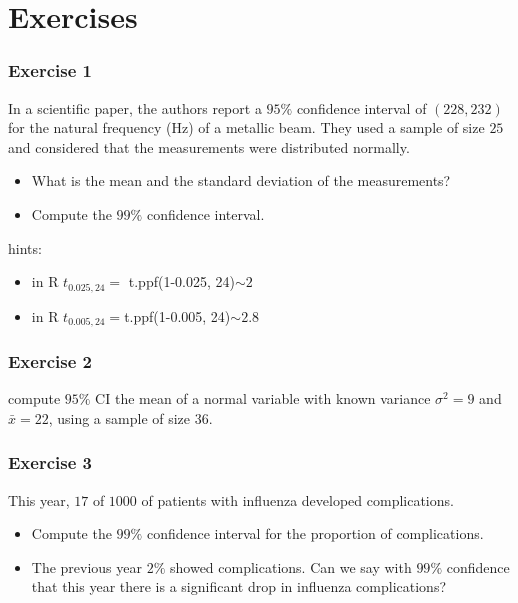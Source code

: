 \documentclass[
]{book}
\begin{document}
\hypertarget{exercises-11}{%
\section{Exercises}\label{exercises-11}}

\hypertarget{exercise-1-10}{%
\subsubsection{Exercise 1}\label{exercise-1-10}}

In a scientific paper, the authors report a \(95\%\) confidence interval of \((228, 232)\) for the natural frequency (Hz) of a metallic beam. They used a sample of size \(25\) and considered that the measurements were distributed normally.

\begin{itemize}
\item
  What is the mean and the standard deviation of the measurements?
\item
  Compute the \(99\%\) confidence interval.
\end{itemize}

hints:

\begin{itemize}
\item
  in R \(t_{0.025, 24}=\) t.ppf(1-0.025, 24)\(\sim 2\)
\item
  in R \(t_{0.005, 24}=\)t.ppf(1-0.005, 24)\(\sim 2.8\)
\end{itemize}

\hypertarget{exercise-2-10}{%
\subsubsection{Exercise 2}\label{exercise-2-10}}

compute \(95\%\) CI the mean of a normal variable with known variance \(\sigma^2=9\) and \(\bar{x}=22\), using a sample of size \(36\).

\hypertarget{exercise-3-8}{%
\subsubsection{Exercise 3}\label{exercise-3-8}}

This year, \(17\) of \(1000\) of patients with influenza developed complications.

\begin{itemize}
\item
  Compute the \(99\%\) confidence interval for the proportion of complications.
\item
  The previous year \(2\%\) showed complications. Can we say with \(99\%\) confidence that this year there is a significant drop in influenza complications?
\end{itemize}
\end{document}

